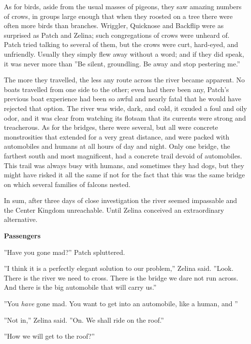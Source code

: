 \documentclass[11pt]{article}
\begin{document}
 As for birds, aside from the usual masses of pigeons, they saw amazing numbers of crows, in groups large enough that when they roosted on a tree there were often more birds than branches. Wriggler, Quicknose and Backflip were as surprised as Patch and Zelina; such congregations of crows were unheard of. Patch tried talking to several of them, but the crows were curt, hard-eyed, and unfriendly. Usually they simply flew away without a word; and if they did speak, it was never more than ''Be silent, groundling. Be away and stop pestering me.''\par
 The more they travelled, the less any route across the river became apparent. No boats travelled from one side to the other; even had there been any, Patch's previous boat experience had been so awful and nearly fatal that he would have rejected that option. The river was wide, dark, and cold, it exuded a foul and oily odor, and it was clear from watching its flotsam that its currents were strong and treacherous. As for the bridges, there were several, but all were concrete monstrosities that extended for a very great distance, and were packed with automobiles and humans at all hours of day and night. Only one bridge, the farthest south and most magnificent, had a concrete trail devoid of automobiles. This trail was always busy with humans, and sometimes they had dogs, but they might have risked it all the same %
 if not for the fact that this was the same bridge on which several families of falcons nested.\par
 In sum, after three days of close investigation the river seemed impassable and the Center Kingdom unreachable. Until Zelina conceived an extraordinary alternative.\par
\par
{\bf Passengers\par
}\par
 ''Have you gone mad?'' Patch spluttered.\par
 ''I think it is a perfectly elegant solution to our problem,'' Zelina said. ''Look. There is the river we need to cross. There is the bridge we dare not run across. And there is the big automobile that will carry us.''\par
 ''You {\it have} gone mad. You want to get into an automobile, like a human, and %
''\par
 ''Not in,'' Zelina said. ''On. We shall ride on the roof.''\par
 ''How we will get to the roof?''\par
\end{document}

